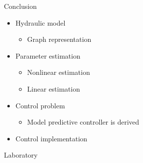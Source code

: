 \begin{frame}{Conclusion}{}


\begin{itemize}
\item<1-> Hydraulic model 
\begin{itemize}
\item Graph representation
\end{itemize}

\item<1-> Parameter estimation 
\begin{itemize}
\item Nonlinear estimation
\item Linear estimation
\end{itemize}

\item<1-> Control problem
\begin{itemize}
\item Model predictive controller is derived
\end{itemize}

\item<1-> Control implementation
\end{itemize}

\end{frame}





\begin{frame}{Laboratory}{}
\end{frame}